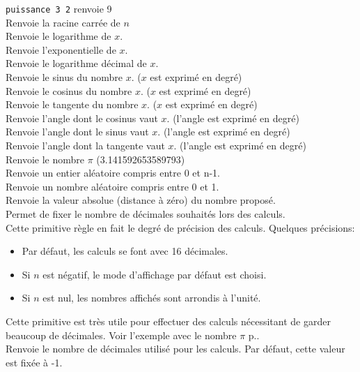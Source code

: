  \texttt{puissance 3 2} renvoie 9\\
 Renvoie la racine carrée de $n$\\
 Renvoie le logarithme de $x$.\\
 Renvoie l'exponentielle de $x$.\\
 Renvoie le logarithme décimal de $x$.\\
Renvoie le sinus du nombre $x$. ($x$ est exprimé en degré)\\
 Renvoie le cosinus du nombre $x$. ($x$ est exprimé en degré)\\
 Renvoie le tangente du nombre $x$. ($x$ est exprimé en degré)\\
 Renvoie l'angle dont le cosinus vaut $x$. (l'angle est exprimé en degré)\\
 Renvoie l'angle dont le sinus vaut $x$. (l'angle est exprimé en degré)\\
 Renvoie l'angle dont la tangente vaut $x$. (l'angle est exprimé en degré)\\
 Renvoie le nombre $\pi$ (3.141592653589793)\\
 Renvoie un entier aléatoire compris entre 0 et n-1.  \\
 Renvoie un nombre aléatoire compris entre 0 et 1.  \\
 Renvoie la valeur absolue (distance à zéro) du nombre proposé.  \\
Permet de fixer le nombre de décimales souhaités lors des calculs.\\
Cette primitive règle en fait le degré de précision des calculs. Quelques précisions:
\begin{itemize}
 \item Par défaut, les calculs se font avec 16 décimales.
 \item Si $n$ est négatif, le mode d'affichage par défaut est choisi. 
 \item Si $n$ est nul, les nombres affichés sont arrondis à l'unité.
\end{itemize}
Cette primitive est très utile pour effectuer des calculs nécessitant de garder beaucoup de décimales.
Voir l'exemple avec le nombre $\pi$ p.\pageref{approx-pi}.\\
Renvoie le nombre de décimales utilisé pour les calculs. Par défaut, cette valeur est fixée à -1.\\
